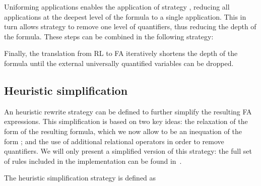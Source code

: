 \documentclass{llncs}
\begin{document}
Uniforming applications enables the application of strategy
, reducing all applications at the deepest level of the
formula to a single application. This in turn allows strategy
 to remove one level of quantifiers, thus reducing the
depth of the formula. These steps can be combined in the following strategy:


Finally, the translation from RL to FA iteratively shortens the depth
of the formula until the external universally quantified variables can
be dropped.



\subsection{Heuristic simplification}
\label{sec:heuristics}

An heuristic rewrite strategy can be defined to further simplify the
resulting FA expressions. This simplification is based on two key
ideas: the relaxation of the form of the resulting formula, which we
now allow to be an inequation of the form ; and the use of
additional relational operators in order to remove quantifiers. We
will only present a simplified version of this strategy: the full set
of rules included in the implementation can be found in~\cite{allpf}.

The heuristic simplification strategy is defined as
\end{document}
